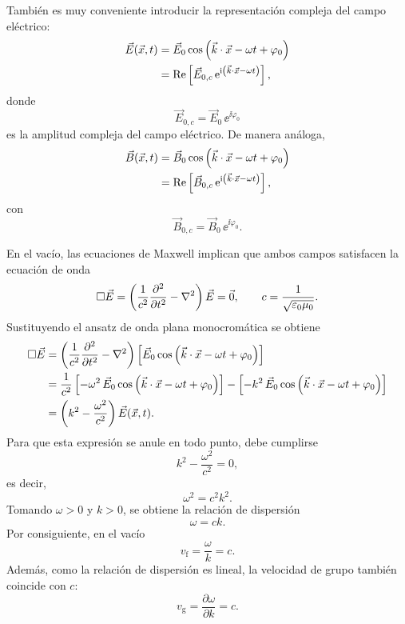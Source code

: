 \documentclass[../main.tex]{subfiles}
\begin{document}
También es muy conveniente introducir la representación compleja del campo eléctrico:
\begin{align*}
    \vec{E}(\vec x,t)
    &= \vec E_0 \cos\left(\vec k\cdot\vec x-\omega t+\varphi_0\right) \\
    &= \operatorname{Re}\left[\vec E_{0,c}\,\mathrm{e}^{\mathrm{i}\left(\vec k\cdot\vec x-\omega t\right)}\right],
\end{align*}
donde
\begin{equation*}
    \vec E_{0,c}=\vec E_0\,\ee^{\ii\varphi_0}
\end{equation*}
es la amplitud compleja del campo eléctrico. De manera análoga,
\begin{align*}
    \vec{B}(\vec x,t)
    &= \vec B_0 \cos\left(\vec k\cdot\vec x-\omega t+\varphi_0\right) \\
    &= \operatorname{Re}\left[\vec B_{0,c}\,\mathrm{e}^{\mathrm{i}\left(\vec k\cdot\vec x-\omega t\right)}\right],
\end{align*}
con
\begin{equation*}
    \vec B_{0,c}=\vec B_0\,\ee^{\ii\varphi_0}.
\end{equation*}

En el vacío, las ecuaciones de Maxwell implican que ambos campos satisfacen la ecuación de onda
\begin{equation*}
    \Box \vec{E}
    =\left(\frac{1}{c^2}\frac{\partial^2}{\partial t^2}-\nabla^2\right)\vec{E}
    =\vec 0,
    \qquad
    c=\frac{1}{\sqrt{\varepsilon_0\mu_0}}.
\end{equation*}
Sustituyendo el ansatz de onda plana monocromática se obtiene
\begin{align*}
    \Box \vec{E}
    &=\left(\frac{1}{c^2}\frac{\partial^2}{\partial t^2}-\nabla^2\right)
      \left[\vec E_0\cos\left(\vec k\cdot\vec x-\omega t+\varphi_0\right)\right] \\
    &=\frac{1}{c^2}\left[-\omega^2\,\vec E_0\cos\left(\vec k\cdot\vec x-\omega t+\varphi_0\right)\right]
      -\left[-k^2\,\vec E_0\cos\left(\vec k\cdot\vec x-\omega t+\varphi_0\right)\right] \\
    &=\left(k^2-\frac{\omega^2}{c^2}\right)\vec{E}(\vec x,t).
\end{align*}
Para que esta expresión se anule en todo punto, debe cumplirse
\begin{equation*}
    k^2-\frac{\omega^2}{c^2}=0,
\end{equation*}
es decir,
\begin{equation*}
    \omega^2=c^2k^2.
\end{equation*}
Tomando $\omega>0$ y $k>0$, se obtiene la relación de dispersión
\begin{equation*}
    \omega=ck.
\end{equation*}
Por consiguiente, en el vacío
\begin{equation*}
    v_{\mathrm f}=\frac{\omega}{k}=c.
\end{equation*}
Además, como la relación de dispersión es lineal, la velocidad de grupo también coincide con $c$:
\begin{equation*}
    v_{\mathrm g}=\frac{\partial \omega}{\partial k}=c.
\end{equation*}
\end{document}
